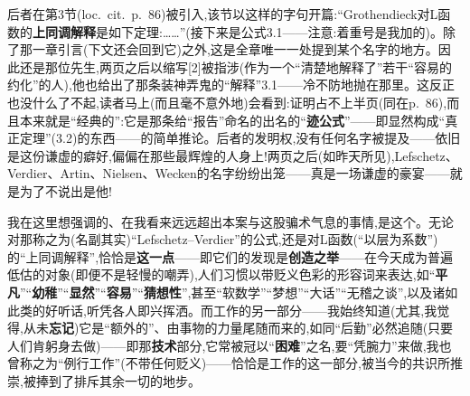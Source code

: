 后者在第3节(loc.~cit.~p.~86)被引入,该节以这样的字句开篇:“Grothendieck对L函数的\textbf{上同调解释}是如下定理:……”(接下来是公式3.1——注意:着重号是我加的)。除了那一章引言(下文还会回到它)之外,这是全章唯一一处提到某个名字的地方。因此还是那位先生,两页之后以缩写[2]被指涉(作为一个“清楚地解释了”若干“容易的约化”的人),他也给出了那条装神弄鬼的“解释”3.1——冷不防地抛在那里。这反正也没什么了不起,读者马上(而且毫不意外地)会看到:证明占不上半页(同在p.~86),而且本来就是“经典的”:它是那条给“报告”命名的出名的“\textbf{迹公式}”——即显然构成“真正定理”(3.2)的东西——的简单推论。后者的发明权,没有任何名字被提及——依旧是这份谦虚的癖好,偏偏在那些最辉煌的人身上!两页之后(如昨天所见\dmark{}),Lefschetz、Verdier、Artin、Nielsen、Wecken的名字纷纷出笼——真是一场谦虚的豪宴——就是为了不说出是他!

我在这里想强调的、在我看来远远超出本案与这股骗术气息的事情,是这个。无论对那称之为(名副其实)“Lefschetz--Verdier”的公式,还是对L函数(“以层为系数”)的“上同调解释”,恰恰是\textbf{这一点}——即它们的发现是\textbf{创造之举}——在今天成为普遍低估的对象(即便不是轻慢的嘲弄),人们习惯以带贬义色彩的形容词来表达,如“\textbf{平凡}”“\textbf{幼稚}”“\textbf{显然}”“\textbf{容易}”“\textbf{猜想性}”,甚至“软数学”“梦想”“大话”“无稽之谈”,以及诸如此类的好听话,听凭各人即兴挥洒。而工作的另一部分——我始终知道(尤其,我觉得,从未\textbf{忘记})它是“额外的”、由事物的力量尾随而来的,如同“后勤”必然追随(只要人们肯躬身去做)——即那\textbf{技术}部分,它常被冠以“\textbf{困难}”之名,要“凭腕力”来做,我也曾称之为“例行工作”(不带任何贬义)——恰恰是工作的这一部分,被当今的共识所推崇,被捧到了排斥其余一切的地步。

